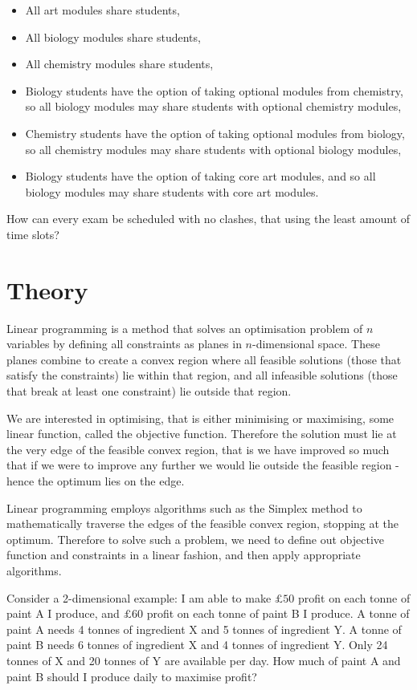 \begin{itemize}
  \item All art modules share students,
  \item All biology modules share students,
  \item All chemistry modules share students,
  \item Biology students have the option of taking optional modules from
  chemistry, so all biology modules may share students with optional chemistry
  modules,
  \item Chemistry students have the option of taking optional modules from
  biology, so all chemistry modules may share students with optional biology
  modules,
  \item Biology students have the option of taking core art modules, and so all
  biology modules may share students with core art modules.
\end{itemize}

How can every exam be scheduled with no clashes, that using the least amount of
time slots?


\section{Theory}\label{sec:theory}
Linear programming is a method that solves an optimisation problem of $n$
variables by defining all constraints as planes in $n$-dimensional space. These
planes combine to create a convex region where all feasible solutions (those
that satisfy the constraints) lie within that region, and all infeasible
solutions (those that break at least one constraint) lie outside that region.

We are interested in optimising, that is either minimising or maximising, some
linear function, called the objective function. Therefore the solution must lie
at the very edge of the feasible convex region, that is we have improved so much
that if we were to improve any further we would lie outside the feasible region
- hence the optimum lies on the edge.

Linear programming employs algorithms such as the Simplex method to
mathematically traverse the edges of the feasible convex region, stopping at
the optimum. Therefore to solve such a problem, we need to define out objective
function and constraints in a linear fashion, and then apply appropriate
algorithms.

Consider a 2-dimensional example: I am able to make $\pounds 50$ profit on each
tonne of paint A I produce, and $\pounds 60$ profit on each tonne of paint B I
produce. A tonne of paint A needs 4 tonnes of ingredient X and 5 tonnes of
ingredient Y. A tonne of paint B needs 6 tonnes of ingredient X and 4 tonnes of
ingredient Y. Only 24 tonnes of X and 20 tonnes of Y are available per day. How
much of paint A and paint B should I produce daily to maximise profit?

